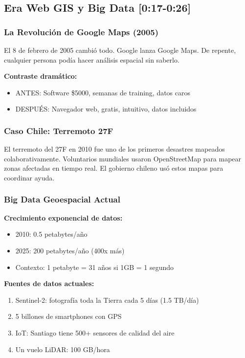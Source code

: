 \documentclass[11pt,a4paper]{article}
\newcommand{\tiempo}[1]{\textcolor{timecolor}{\textbf{[#1]}}}
\newcommand{\decir}[1]{\begin{tcolorbox}[colback=blue!5,colframe=usachblue,title={DECIR}]#1\end{tcolorbox}}
\begin{document}
\subsection{Era Web GIS y Big Data \tiempo{0:17-0:26}}

\subsubsection{La Revolución de Google Maps (2005)}

\decir{El 8 de febrero de 2005 cambió todo. Google lanza Google Maps. De repente, cualquier persona podía hacer análisis espacial sin saberlo.}

\textbf{Contraste dramático:}
\begin{itemize}
    \item ANTES: Software \$5000, semanas de training, datos caros
    \item DESPUÉS: Navegador web, gratis, intuitivo, datos incluidos
\end{itemize}

\subsubsection{Caso Chile: Terremoto 27F}

\decir{El terremoto del 27F en 2010 fue uno de los primeros desastres mapeados colaborativamente. Voluntarios mundiales usaron OpenStreetMap para mapear zonas afectadas en tiempo real. El gobierno chileno usó estos mapas para coordinar ayuda.}

\subsubsection{Big Data Geoespacial Actual}

\textbf{Crecimiento exponencial de datos:}
\begin{itemize}
    \item 2010: 0.5 petabytes/año
    \item 2025: 200 petabytes/año (400x más)
    \item Contexto: 1 petabyte = 31 años si 1GB = 1 segundo
\end{itemize}

\textbf{Fuentes de datos actuales:}
\begin{enumerate}
    \item Sentinel-2: fotografía toda la Tierra cada 5 días (1.5 TB/día)
    \item 5 billones de smartphones con GPS
    \item IoT: Santiago tiene 500+ sensores de calidad del aire
    \item Un vuelo LiDAR: 100 GB/hora
\end{enumerate}
\end{document}
